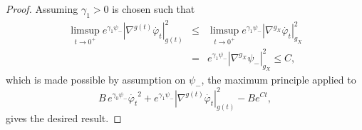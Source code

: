 \documentclass[10pt,a4paper]{amsart}
\newcommand{\f}{\varphi}
\begin{document}
\begin{proof}
 Assuming $\gamma_1>0$ is chosen such that  
\begin{eqnarray*}
 \limsup_{t\rightarrow 0^+}e^{\gamma_1\psi_{-}}|\nabla^{g(t)}\dot{\f_t}|_{g(t)}^2
 &\leq & \limsup_{t\rightarrow 0^+}e^{\gamma_1\psi_{-}}|\nabla^{g_X}\dot{\f_t}|_{g_X}^2 \\
 &=& e^{\gamma_1\psi_{-}}|\nabla^{g_X}\psi_{-}|_{g_X}^2\leq C,
 \end{eqnarray*}
 which is made possible by assumption on $\psi_{-}$, the maximum principle applied to $$B\,e^{\gamma_0\psi_{-}}\dot{\f_t}^2+e^{\gamma_1\psi_{-}}|\nabla^{g(t)}\dot{\f_t}|_{g(t)}^2-Be^{Ct},$$ gives the desired result.
\end{proof}
\end{document}
